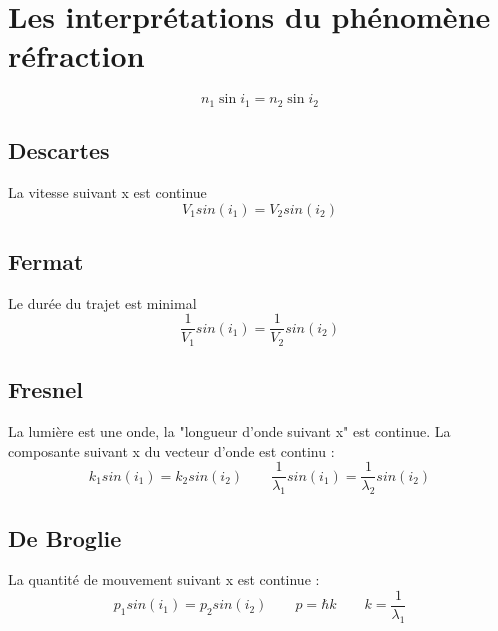 \section{Les interprétations du phénomène réfraction}
\begin{minipage}[c]{.45\linewidth}
\begin{center}
\end{center}

\end{minipage}
\hfill
\begin{minipage}[c]{.45\linewidth}
\[
n_1 \sin i_1 = n_2 \sin i_2
\]
\end{minipage}

\subsection{Descartes}
\begin{center}
\end{center}
La vitesse suivant x est continue
\[
V_1sin(i_1)=V_2sin(i_2)
\]
\subsection{Fermat}
Le durée du trajet est minimal
\[
\frac{1}{V_1}sin(i_1)=\frac{1}{V_2}sin(i_2)
\]
\subsection{Fresnel}
\begin{minipage}[c]{.45\linewidth}
\begin{center}

\end{center}
\end{minipage}
\hfill
\begin{minipage}[c]{.45\linewidth}
\begin{center}
\end{center}
\end{minipage}

La lumière est une onde, la "longueur d'onde suivant x" est continue. La composante suivant x du vecteur d'onde est continu :
\[
k_1sin(i_1)=k_2sin(i_2) \qquad \frac{1}{\lambda_1}sin(i_1)=\frac{1}{\lambda_2}sin(i_2)
\]
\subsection{De Broglie}
La quantité de mouvement suivant x est continue :
\[
p_1sin(i_1)=p_2sin(i_2) \qquad p=\hbar k \qquad k=\frac{1}{\lambda_1}
\]
